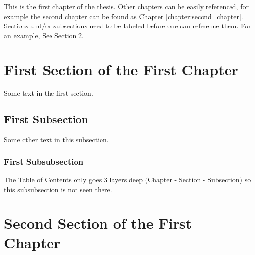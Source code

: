 This is the first chapter of the thesis. Other chapters can be easily referenced, for example the second chapter can be found as Chapter \ref{chapter:second_chapter}. Sections and/or subsections need to be labeled before one can reference them. For an example, See Section \ref{sec:second-section}.

\section{First Section of the First Chapter}
Some text in the first section.
\subsection{First Subsection}
Some other text in this subsection.
\subsubsection{First Subsubsection}
The Table of Contents only goes 3 layers deep (Chapter - Section - Subsection) so this subsubsection is not seen there.

\section{Second Section of the First Chapter}\label{sec:second-section}